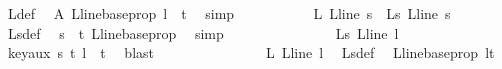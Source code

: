 \begin{isabellebody}
\ {\isasymchi}L{\isacharunderscore}{\kern0pt}def\ \isamarkupfalse%
\ A\ L{\isacharunderscore}{\kern0pt}line{\isacharunderscore}{\kern0pt}base{\isacharunderscore}{\kern0pt}prop\ {\isacartoucheopen}l\ {\isacharless}{\kern0pt}\ t{\isacartoucheclose}\ \isamarkupfalse%
\ simp\isanewline
\ \ \ \ \ \ \ \ \isamarkupfalse%
\ {\isachardoublequoteopen}{\isasymphi}\ {\isacharparenleft}{\kern0pt}{\isasymchi}L\ {\isacharparenleft}{\kern0pt}L{\isacharunderscore}{\kern0pt}line\ s{\isacharparenright}{\kern0pt}{\isacharparenright}{\kern0pt}\ {\isacharequal}{\kern0pt}\ {\isasymchi}L{\isacharunderscore}{\kern0pt}s\ {\isacharparenleft}{\kern0pt}L{\isacharunderscore}{\kern0pt}line\ s{\isacharparenright}{\kern0pt}{\isachardoublequoteclose}\ \isamarkupfalse%
\ {\isasymchi}L{\isacharunderscore}{\kern0pt}s{\isacharunderscore}{\kern0pt}def\ \isamarkupfalse%
\ {\isacartoucheopen}s\ {\isacharless}{\kern0pt}\ t{\isacartoucheclose}\ L{\isacharunderscore}{\kern0pt}line{\isacharunderscore}{\kern0pt}base{\isacharunderscore}{\kern0pt}prop\ \isamarkupfalse%
\ simp\isanewline
\ \ \ \ \ \ \ \ \isamarkupfalse%
\ \isamarkupfalse%
\ {\isachardoublequoteopen}\ {\isachardot}{\kern0pt}{\isachardot}{\kern0pt}{\isachardot}{\kern0pt}\ {\isacharequal}{\kern0pt}\ \ {\isasymchi}L{\isacharunderscore}{\kern0pt}s\ {\isacharparenleft}{\kern0pt}L{\isacharunderscore}{\kern0pt}line\ l{\isacharparenright}{\kern0pt}{\isachardoublequoteclose}\ \isamarkupfalse%
\ key{\isacharunderscore}{\kern0pt}aux\ {\isacartoucheopen}s\ {\isacharless}{\kern0pt}t{\isacartoucheclose}\ {\isacartoucheopen}l\ {\isacharless}{\kern0pt}\ t{\isacartoucheclose}\ \isamarkupfalse%
\ blast\isanewline
\ \ \ \ \ \ \ \ \isamarkupfalse%
\ \isamarkupfalse%
\ {\isachardoublequoteopen}\ {\isachardot}{\kern0pt}{\isachardot}{\kern0pt}{\isachardot}{\kern0pt}\ {\isacharequal}{\kern0pt}\ {\isasymphi}\ {\isacharparenleft}{\kern0pt}{\isasymchi}L\ {\isacharparenleft}{\kern0pt}L{\isacharunderscore}{\kern0pt}line\ l{\isacharparenright}{\kern0pt}{\isacharparenright}{\kern0pt}{\isachardoublequoteclose}\ \isamarkupfalse%
\ {\isasymchi}L{\isacharunderscore}{\kern0pt}s{\isacharunderscore}{\kern0pt}def\ \isamarkupfalse%
\ L{\isacharunderscore}{\kern0pt}line{\isacharunderscore}{\kern0pt}base{\isacharunderscore}{\kern0pt}prop\ {\isacartoucheopen}l{\isacharless}{\kern0pt}t{\isacartoucheclose}\ \isamarkupfalse%

\end{isabellebody}
